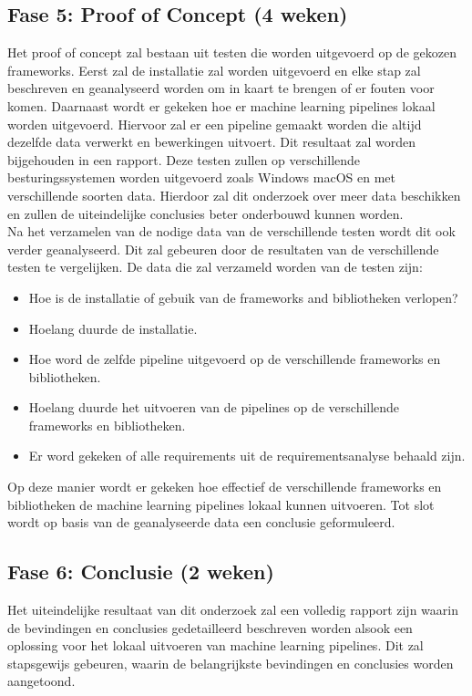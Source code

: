 \subsection{Fase 5: Proof of Concept (4 weken)}
Het proof of concept zal bestaan uit testen die worden uitgevoerd op de gekozen frameworks. Eerst zal de installatie zal worden uitgevoerd en elke stap zal beschreven en geanalyseerd worden om in kaart te brengen of er fouten voor komen. Daarnaast wordt er gekeken hoe er machine learning pipelines lokaal worden uitgevoerd. Hiervoor zal er een pipeline gemaakt worden die altijd dezelfde data verwerkt en bewerkingen uitvoert. Dit resultaat zal worden bijgehouden in een rapport.
Deze testen zullen op verschillende besturingssystemen worden uitgevoerd zoals Windows macOS en met verschillende soorten data. Hierdoor zal dit onderzoek over meer data beschikken en zullen de uiteindelijke conclusies beter onderbouwd kunnen worden.\\
Na het verzamelen van de nodige data van de verschillende testen wordt dit ook verder geanalyseerd. Dit zal gebeuren door de resultaten van de verschillende testen te vergelijken. 
De data die zal verzameld worden van de testen zijn:
\begin{itemize}
  \item Hoe is de installatie of gebuik van de frameworks and bibliotheken verlopen?
  \item Hoelang duurde de installatie.
  \item Hoe word de zelfde pipeline uitgevoerd op de verschillende frameworks en bibliotheken.
  \item Hoelang duurde het uitvoeren van de pipelines op de verschillende frameworks en bibliotheken.
  \item Er word gekeken of alle requirements uit de requirementsanalyse behaald zijn.
\end{itemize}
Op deze manier wordt er gekeken hoe effectief de verschillende frameworks en bibliotheken de machine learning pipelines lokaal kunnen uitvoeren. Tot slot wordt op basis van de geanalyseerde data een conclusie geformuleerd.\\
\subsection{Fase 6: Conclusie (2 weken)}
Het uiteindelijke resultaat van dit onderzoek zal een volledig rapport zijn waarin de bevindingen en conclusies gedetailleerd beschreven worden alsook een oplossing voor het lokaal uitvoeren van machine learning pipelines. Dit zal stapsgewijs gebeuren, waarin de belangrijkste bevindingen en conclusies worden aangetoond.\\

